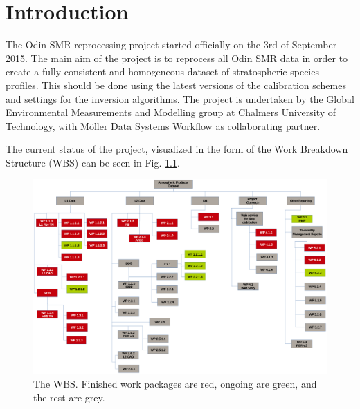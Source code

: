 \chapter{Introduction}
\label{chapter:introduction}

\setcounter{page}{1}


The Odin SMR reprocessing project started officially on the 3rd of September 2015. The main aim of the project is to reprocess all Odin SMR data in order to create a fully consistent and homogeneous dataset of stratospheric species profiles. This should be done using the latest versions of the calibration schemes and settings for the inversion algorithms. The project is undertaken by the Global Environmental Measurements and Modelling group at Chalmers University of Technology, with M\"oller Data Systems Workflow as collaborating partner.   

The current status of the project, visualized in the form of the Work Breakdown Structure (WBS) can be seen in Fig. \ref{fig:WBS}.

\begin{figure}[t]
\centering
\includegraphics[scale = 0.5]{figures/wbsTMMR3.eps}
\caption{The WBS. Finished work packages are red, ongoing are green, and the rest are grey.}
\label{fig:WBS}
\end{figure}

